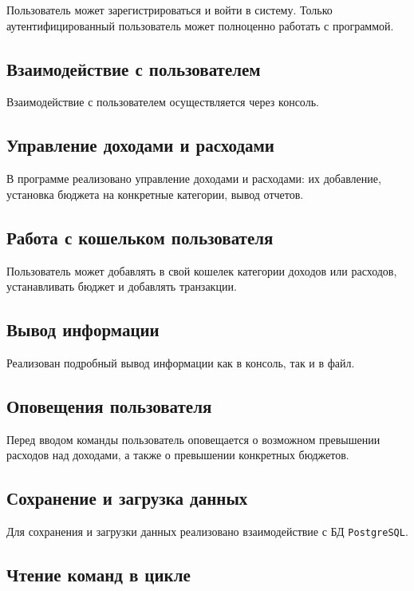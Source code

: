 \documentclass[a4paper, 14pt]{article}
\begin{document}
Пользователь может зарегистрироваться и войти в систему. Только аутентифицированный пользователь может полноценно работать с программой.

\subsection{Взаимодействие с пользователем}

Взаимодействие с пользователем осуществляется через консоль.

\subsection{Управление доходами и расходами}

В программе реализовано управление доходами и расходами: их добавление, установка бюджета на конкретные категории, вывод отчетов.

\subsection{Работа с кошельком пользователя}

Пользователь может добавлять в свой кошелек категории доходов или расходов, устанавливать бюджет и добавлять транзакции.

\subsection{Вывод информации}

Реализован подробный вывод информации как в консоль, так и в файл.

\subsection{Оповещения пользователя}

Перед вводом команды пользователь оповещается о возможном превышении расходов над доходами, а также о превышении конкретных бюджетов.

\subsection{Сохранение и загрузка данных}

Для сохранения и загрузки данных реализовано взаимодействие с БД \texttt{PostgreSQL}.

\subsection{Чтение команд в цикле}
\end{document}
